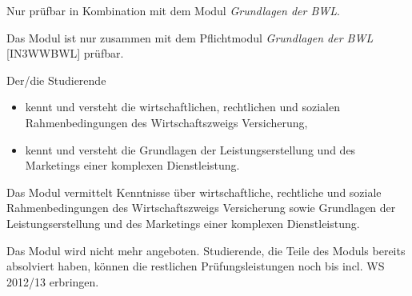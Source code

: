 \begin{module}
\begin{styleenv}
\begin{assessment}
\end{assessment}

\begin{conditions}Nur prüfbar in Kombination mit dem Modul \emph{Grundlagen der BWL}.

 

Das Modul ist nur zusammen mit dem Pflichtmodul \emph{Grundlagen der BWL} [IN3WWBWL] prüfbar.

\end{conditions}


\end{styleenv}

\begin{learningoutcomes}
Der/die Studierende

 \begin{itemize}\item kennt und versteht die wirtschaftlichen, rechtlichen und sozialen Rahmenbedingungen des Wirtschaftszweigs Versicherung,  \item kennt und versteht die Grundlagen der Leistungserstellung und des Marketings einer komplexen Dienstleistung.  \end{itemize}
\end{learningoutcomes}

\begin{content}
Das Modul vermittelt Kenntnisse über wirtschaftliche, rechtliche und soziale Rahmenbedingungen des Wirtschaftszweigs Versicherung sowie Grundlagen der Leistungserstellung und des Marketings einer komplexen Dienstleistung.


\end{content}

\begin{remarks}Das Modul wird nicht mehr angeboten. Studierende, die Teile des Moduls bereits absolviert haben, können die restlichen Prüfungsleistungen noch bis incl. WS 2012/13 erbringen.

\end{remarks}

\end{module}

